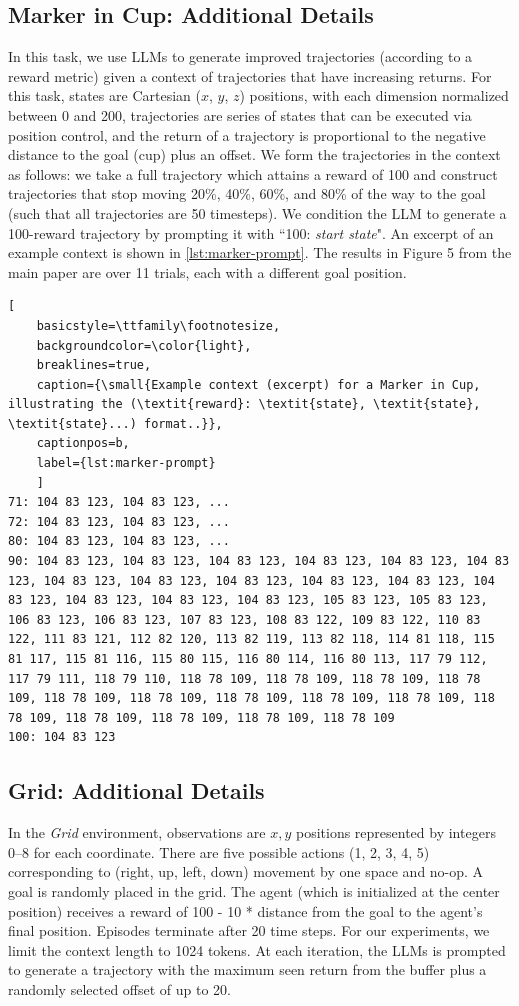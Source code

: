 \documentclass{article}
\begin{document}
\subsection{Marker in Cup: Additional Details}
In this task, we use LLMs to generate improved trajectories (according to a reward metric) given a context of trajectories that have increasing returns. For this task, states are Cartesian ($x$, $y$, $z$) positions, with each dimension normalized between 0 and 200, trajectories are series of states that can be executed via position control, and the return of a trajectory is proportional to the negative distance to the goal (cup) plus an offset. We form the trajectories in the context as follows: we take a full trajectory which attains a reward of 100 and construct trajectories that stop moving 20\%, 40\%, 60\%, and 80\% of the way to the goal (such that all trajectories are 50 timesteps). We condition the LLM to generate a 100-reward trajectory by prompting it with ``100: \textit{start state}".  An excerpt of an example context is shown in \cref{lst:marker-prompt}. The results in Figure 5 from the main paper are over 11 trials, each with a different goal position.
\begin{lstlisting}[
    basicstyle=\ttfamily\footnotesize,
    backgroundcolor=\color{light},
    breaklines=true,
    caption={\small{Example context (excerpt) for a Marker in Cup, illustrating the (\textit{reward}: \textit{state}, \textit{state}, \textit{state}...) format..}},
    captionpos=b,
    label={lst:marker-prompt}
    ]
71: 104 83 123, 104 83 123, ...
72: 104 83 123, 104 83 123, ...
80: 104 83 123, 104 83 123, ...
90: 104 83 123, 104 83 123, 104 83 123, 104 83 123, 104 83 123, 104 83 123, 104 83 123, 104 83 123, 104 83 123, 104 83 123, 104 83 123, 104 83 123, 104 83 123, 104 83 123, 104 83 123, 105 83 123, 105 83 123, 106 83 123, 106 83 123, 107 83 123, 108 83 122, 109 83 122, 110 83 122, 111 83 121, 112 82 120, 113 82 119, 113 82 118, 114 81 118, 115 81 117, 115 81 116, 115 80 115, 116 80 114, 116 80 113, 117 79 112, 117 79 111, 118 79 110, 118 78 109, 118 78 109, 118 78 109, 118 78 109, 118 78 109, 118 78 109, 118 78 109, 118 78 109, 118 78 109, 118 78 109, 118 78 109, 118 78 109, 118 78 109, 118 78 109
100: 104 83 123
\end{lstlisting}
\subsection{Grid: Additional Details}
In the \textit{Grid} environment, observations are $x, y$ positions represented by integers 0--8 for each coordinate. There are five possible actions (1, 2, 3, 4, 5) corresponding to (right, up, left, down) movement by one space and no-op. A goal is randomly placed in the grid. The agent (which is initialized at the center position) receives a reward of 100 - 10 * distance from the goal to the agent's final position. Episodes terminate after 20 time steps. For our experiments, we limit the context length to 1024 tokens. At each iteration, the LLMs is prompted to generate a trajectory with the maximum seen return from the buffer plus a randomly selected offset of up to 20.
\end{document}
